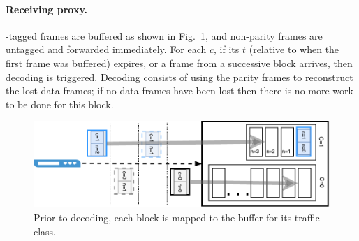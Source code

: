 \paragraph{Receiving proxy.}
\OurSys-tagged frames are buffered as shown in Fig.~\ref{fig:example-decode},
and non-parity frames are untagged and forwarded immediately.
For each $c$, if its $t$ (relative to when the first
frame was buffered) expires, or a frame from a successive block arrives, 
then decoding is triggered. Decoding consists of using the parity frames to
reconstruct the lost data frames; if no data frames have been lost then there
is no more work to be done for this block.

\begin{figure}
  \centering
  \includegraphics[width=0.4\paperwidth]{figures/example-decode.pdf}
  \caption{\label{fig:example-decode}Prior to decoding, each block is mapped to the buffer for its traffic class.}
\end{figure}
